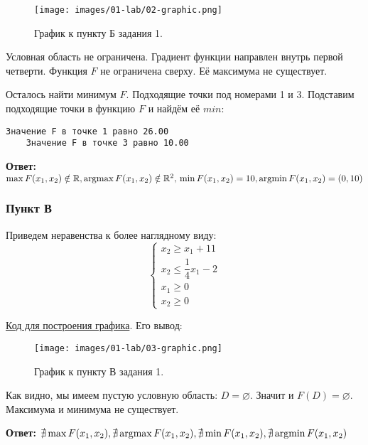\begin{figure}[H]
    \texttt{[image: images/01-lab/02-graphic.png]}
    \caption{График к пункту Б задания 1.}
    \label{01-lab-02-graphic}
\end{figure}

Условная область не ограничена. Градиент функции направлен внутрь первой четверти. Функция $F$ не ограничена сверху. Её максимума не существует.

Осталось найти минимум $F$. Подходящие точки под номерами 1 и 3. Подставим подходящие точки в функцию $F$ и найдём её $min$:

\begin{lstlisting}[language=text]
    Значение F в точке 1 равно 26.00
    Значение F в точке 3 равно 10.00
\end{lstlisting}

\textbf{Ответ:} $\max F(x_1, x_2) \notin \mathbb R, \operatorname*{argmax} F(x_1, x_2) \notin \mathbb R^2,\\
    \min F(x_1, x_2) = 10, \operatorname*{argmin} F(x_1, x_2) = (0, 10)$ \label{01-lab-b-answer}

\subsubsection{Пункт В}\label{01-lab-c}

Приведем неравенства к более наглядному виду:
\[
    \begin{cases}
        x_2 \geq x_1 + 11            \\
        x_2 \leq \dfrac{1}{4}x_1 - 2 \\
        x_1 \geq 0                   \\
        x_2 \geq 0
    \end{cases}
\]

\href{https://github.com/retrobannerS/optimization_methods/blob/main/python/01-lab/C.%2001.py}{Код для построения графика}. Его вывод:

\begin{figure}[H]
    \texttt{[image: images/01-lab/03-graphic.png]}
    \caption{График к пункту В задания 1.}
    \label{01-lab-03-graphic}
\end{figure}

Как видно, мы имеем пустую условную область: $D = \varnothing$. Значит и $F(D) = \varnothing$. Максимума и минимума не существует.

\textbf{Ответ:} $\nexists\max F(x_1, x_2), \nexists\operatorname*{argmax} F(x_1, x_2), \nexists\min F(x_1, x_2), \nexists\operatorname*{argmin} F(x_1, x_2)$ \label{01-lab-c-answer}



